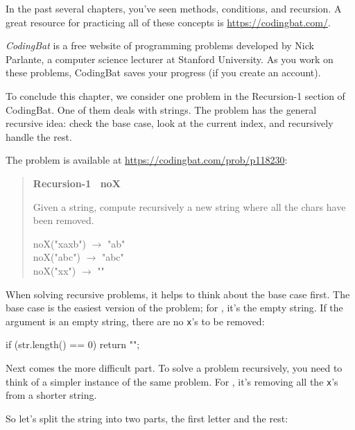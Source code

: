 In the past several chapters, you've seen methods, conditions, 
and recursion.
A great resource for practicing all of these concepts is \url{https://codingbat.com/}.


{\it CodingBat} is a free website of programming problems developed by Nick Parlante, a computer science lecturer at Stanford University.
As you work on these problems, CodingBat saves your progress (if you create an account).

To conclude this chapter, we consider one problem in the {\sf Recursion-1} section of CodingBat.
One of them deals with strings.
The problem has the general recursive idea: check the base case, look at the current index, and recursively handle the rest.

The problem is available at \url{https://codingbat.com/prob/p118230}:

\begin{quote}
\textbf{Recursion-1 ~noX}

Given a string, compute recursively a new string where all the  chars have been removed.

\ttfamily
noX("xaxb") $\rightarrow$ "ab" \\
noX("abc") $\rightarrow$ "abc" \\
noX("xx") $\rightarrow$ ""
\end{quote}

When solving recursive problems, it helps to think about the base case first.
The base case is the easiest version of the problem; for , it's the empty string.
If the argument is an empty string, there are no {\tt x}'s to be removed:

\begin{code}
if (str.length() == 0) {
    return "";
}
\end{code}


Next comes the more difficult part.
To solve a problem recursively, you need to think of a simpler instance of the same problem.
For , it's removing all the {\tt x}'s from a shorter string.

So let's split the string into two parts, the first letter and the rest:

